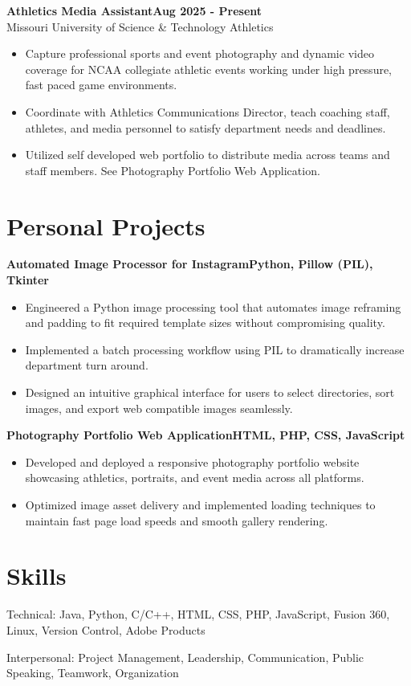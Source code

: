 \documentclass[11pt]{article}
\newcommand{\resumeEntry}[3]{
    \textbf{#1}\hfill\textbf{#2}\\#3
}
\newcommand{\resumeEntryPersonal}[2]{
    \textbf{#1}\hfill\textbf{#2}
}
\begin{document}
\resumeEntry{Athletics Media Assistant}{Aug 2025 - Present}{Missouri University of Science \& Technology Athletics}
\begin{itemize}
    \item[$\bullet$] Capture professional sports and event photography and dynamic video coverage for NCAA collegiate athletic events working under high pressure, fast paced game environments.
    \item[$\bullet$] Coordinate with Athletics Communications Director, teach coaching staff, athletes, and media personnel to satisfy department needs and deadlines.
    \item[$\bullet$] Utilized self developed web portfolio to distribute media across teams and staff members. See Photography Portfolio Web Application.
\end{itemize}

\vspace{0.2em}

\section*{Personal Projects}

\resumeEntryPersonal{Automated Image Processor for Instagram}{Python, Pillow (PIL), Tkinter}
\begin{itemize}
    \item[$\bullet$] Engineered a Python image processing tool that automates image reframing and padding to fit required template sizes without compromising quality.
    \item[$\bullet$] Implemented a batch processing workflow using PIL to dramatically increase department turn around.
    \item[$\bullet$] Designed an intuitive graphical interface for users to select directories, sort images, and export web compatible images seamlessly.
\end{itemize}

\vspace{0.2em}

\resumeEntryPersonal{Photography Portfolio Web Application}{HTML, PHP, CSS, JavaScript}
\begin{itemize}
    \item[$\bullet$] Developed and deployed a responsive photography portfolio website showcasing athletics, portraits, and event media across all platforms.
    \item[$\bullet$] Optimized image asset delivery and implemented loading techniques to maintain fast page load speeds and smooth gallery rendering.
\end{itemize}

\section*{Skills}

Technical: Java, Python, C/C++, HTML, CSS, PHP, JavaScript, Fusion 360, Linux, Version Control, Adobe Products

Interpersonal: Project Management, Leadership, Communication, Public Speaking, Teamwork, Organization
\end{document}

